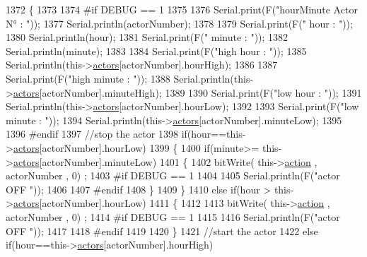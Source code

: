 \begin{DoxyCode}
1372 \{
1373 
1374 \textcolor{preprocessor}{#if DEBUG == 1}
1375 
1376     Serial.print(F(\textcolor{stringliteral}{"hourMinute Actor N° : "}));
1377     Serial.println(actorNumber);
1378 
1379     Serial.print(F(\textcolor{stringliteral}{" hour : "}));
1380     Serial.println(hour);
1381     Serial.print(F(\textcolor{stringliteral}{" minute : "}));
1382     Serial.println(minute);
1383 
1384     Serial.print(F(\textcolor{stringliteral}{"high hour : "}));
1385     Serial.println(this->\hyperlink{class_jetpack_a7e16d2f97837f9712a2e6de1c50d99db}{actors}[actorNumber].hourHigh);
1386 
1387     Serial.print(F(\textcolor{stringliteral}{"high minute : "}));
1388     Serial.println(this->\hyperlink{class_jetpack_a7e16d2f97837f9712a2e6de1c50d99db}{actors}[actorNumber].minuteHigh);
1389 
1390     Serial.print(F(\textcolor{stringliteral}{"low hour : "}));
1391     Serial.println(this->\hyperlink{class_jetpack_a7e16d2f97837f9712a2e6de1c50d99db}{actors}[actorNumber].hourLow);
1392 
1393     Serial.print(F(\textcolor{stringliteral}{"low minute : "}));
1394     Serial.println(this->\hyperlink{class_jetpack_a7e16d2f97837f9712a2e6de1c50d99db}{actors}[actorNumber].minuteLow);
1395 
1396 \textcolor{preprocessor}{#endif}
1397     \textcolor{comment}{//stop the actor}
1398     \textcolor{keywordflow}{if}(hour==this->\hyperlink{class_jetpack_a7e16d2f97837f9712a2e6de1c50d99db}{actors}[actorNumber].hourLow)
1399     \{
1400         \textcolor{keywordflow}{if}(minute>= this->\hyperlink{class_jetpack_a7e16d2f97837f9712a2e6de1c50d99db}{actors}[actorNumber].minuteLow)
1401         \{
1402             bitWrite( this->\hyperlink{class_jetpack_aca3142925a7b0834b34ae91d26af7765}{action} , actorNumber , 0) ;
1403 \textcolor{preprocessor}{        #if DEBUG == 1 }
1404 
1405             Serial.println(F(\textcolor{stringliteral}{"actor OFF "}));
1406 
1407 \textcolor{preprocessor}{        #endif  }
1408         \}
1409     \}
1410     \textcolor{keywordflow}{else} \textcolor{keywordflow}{if}(hour > this->\hyperlink{class_jetpack_a7e16d2f97837f9712a2e6de1c50d99db}{actors}[actorNumber].hourLow)
1411     \{
1412 
1413         bitWrite( this->\hyperlink{class_jetpack_aca3142925a7b0834b34ae91d26af7765}{action} , actorNumber , 0) ;
1414 \textcolor{preprocessor}{    #if DEBUG == 1 }
1415 
1416         Serial.println(F(\textcolor{stringliteral}{"actor OFF "}));
1417 
1418 \textcolor{preprocessor}{    #endif  }
1419     
1420     \}
1421     \textcolor{comment}{//start the actor}
1422     \textcolor{keywordflow}{else} \textcolor{keywordflow}{if}(hour==this->\hyperlink{class_jetpack_a7e16d2f97837f9712a2e6de1c50d99db}{actors}[actorNumber].hourHigh)

\end{DoxyCode}
